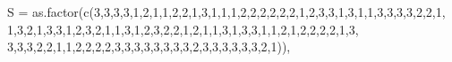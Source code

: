 \documentclass[
  letterpaper,
  DIV=11,
  numbers=noendperiod]{scrartcl}
\newenvironment{Shaded}{\begin{snugshade}}{\end{snugshade}}
\newcommand{\AttributeTok}[1]{\textcolor[rgb]{0.40,0.45,0.13}{#1}}
\newcommand{\DecValTok}[1]{\textcolor[rgb]{0.68,0.00,0.00}{#1}}
\newcommand{\FunctionTok}[1]{\textcolor[rgb]{0.28,0.35,0.67}{#1}}
\newcommand{\NormalTok}[1]{\textcolor[rgb]{0.00,0.23,0.31}{#1}}
\begin{document}
\begin{Shaded}
\begin{Highlighting}[]
  \AttributeTok{S =} \FunctionTok{as.factor}\NormalTok{(}\FunctionTok{c}\NormalTok{(}\DecValTok{3}\NormalTok{,}\DecValTok{3}\NormalTok{,}\DecValTok{3}\NormalTok{,}\DecValTok{3}\NormalTok{,}\DecValTok{1}\NormalTok{,}\DecValTok{2}\NormalTok{,}\DecValTok{1}\NormalTok{,}\DecValTok{1}\NormalTok{,}\DecValTok{2}\NormalTok{,}\DecValTok{2}\NormalTok{,}\DecValTok{1}\NormalTok{,}\DecValTok{3}\NormalTok{,}\DecValTok{1}\NormalTok{,}\DecValTok{1}\NormalTok{,}\DecValTok{1}\NormalTok{,}\DecValTok{2}\NormalTok{,}\DecValTok{2}\NormalTok{,}\DecValTok{2}\NormalTok{,}\DecValTok{2}\NormalTok{,}\DecValTok{2}\NormalTok{,}\DecValTok{2}\NormalTok{,}\DecValTok{1}\NormalTok{,}\DecValTok{2}\NormalTok{,}\DecValTok{3}\NormalTok{,}\DecValTok{3}\NormalTok{,}\DecValTok{1}\NormalTok{,}\DecValTok{3}\NormalTok{,}\DecValTok{1}\NormalTok{,}\DecValTok{1}\NormalTok{,}\DecValTok{3}\NormalTok{,}\DecValTok{3}\NormalTok{,}\DecValTok{3}\NormalTok{,}\DecValTok{3}\NormalTok{,}\DecValTok{2}\NormalTok{,}\DecValTok{2}\NormalTok{,}\DecValTok{1}\NormalTok{,}
        \DecValTok{1}\NormalTok{,}\DecValTok{3}\NormalTok{,}\DecValTok{2}\NormalTok{,}\DecValTok{1}\NormalTok{,}\DecValTok{3}\NormalTok{,}\DecValTok{3}\NormalTok{,}\DecValTok{1}\NormalTok{,}\DecValTok{2}\NormalTok{,}\DecValTok{3}\NormalTok{,}\DecValTok{2}\NormalTok{,}\DecValTok{1}\NormalTok{,}\DecValTok{1}\NormalTok{,}\DecValTok{3}\NormalTok{,}\DecValTok{1}\NormalTok{,}\DecValTok{2}\NormalTok{,}\DecValTok{3}\NormalTok{,}\DecValTok{2}\NormalTok{,}\DecValTok{2}\NormalTok{,}\DecValTok{1}\NormalTok{,}\DecValTok{2}\NormalTok{,}\DecValTok{1}\NormalTok{,}\DecValTok{1}\NormalTok{,}\DecValTok{3}\NormalTok{,}\DecValTok{1}\NormalTok{,}\DecValTok{3}\NormalTok{,}\DecValTok{3}\NormalTok{,}\DecValTok{1}\NormalTok{,}\DecValTok{1}\NormalTok{,}\DecValTok{2}\NormalTok{,}\DecValTok{1}\NormalTok{,}\DecValTok{2}\NormalTok{,}\DecValTok{2}\NormalTok{,}\DecValTok{2}\NormalTok{,}\DecValTok{2}\NormalTok{,}\DecValTok{1}\NormalTok{,}\DecValTok{3}\NormalTok{,}
        \DecValTok{3}\NormalTok{,}\DecValTok{3}\NormalTok{,}\DecValTok{3}\NormalTok{,}\DecValTok{2}\NormalTok{,}\DecValTok{2}\NormalTok{,}\DecValTok{1}\NormalTok{,}\DecValTok{1}\NormalTok{,}\DecValTok{2}\NormalTok{,}\DecValTok{2}\NormalTok{,}\DecValTok{2}\NormalTok{,}\DecValTok{2}\NormalTok{,}\DecValTok{3}\NormalTok{,}\DecValTok{3}\NormalTok{,}\DecValTok{3}\NormalTok{,}\DecValTok{3}\NormalTok{,}\DecValTok{3}\NormalTok{,}\DecValTok{3}\NormalTok{,}\DecValTok{3}\NormalTok{,}\DecValTok{3}\NormalTok{,}\DecValTok{2}\NormalTok{,}\DecValTok{3}\NormalTok{,}\DecValTok{3}\NormalTok{,}\DecValTok{3}\NormalTok{,}\DecValTok{3}\NormalTok{,}\DecValTok{3}\NormalTok{,}\DecValTok{3}\NormalTok{,}\DecValTok{2}\NormalTok{,}\DecValTok{1}\NormalTok{)),}

\end{Highlighting}
\end{Shaded}
\end{document}
